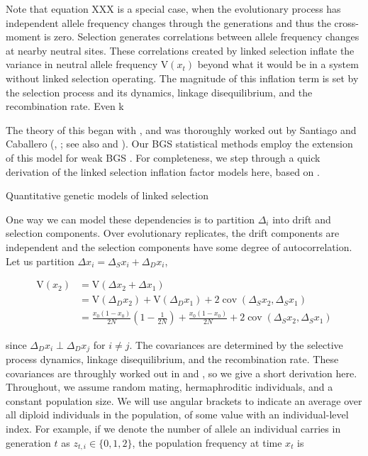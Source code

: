 \documentclass[11pt]{article}
\newcommand{\V}{\text{V}}
\DeclareMathOperator{\cov}{cov}
\begin{document}
Note that equation XXX is a special case, when the evolutionary process has
independent allele frequency changes through the generations and thus the
cross-moment is zero. Selection generates correlations between allele frequency
changes at nearby neutral sites. These correlations created by linked selection
inflate the variance in neutral allele frequency $\V(x_t)$ beyond what it would
be in a system without linked selection operating. The magnitude of this
inflation term is set by the selection process and its dynamics, linkage
disequilibrium, and the recombination rate. Even k




The theory of this began with \textcite{Robertson1961-ho},
and was thoroughly worked out by Santiago and Caballero
(\citeyear{Santiago1995-hx}, \citeyear{Santiago1998-bs}; see also
\cite{Barton2000-zg} and \cite{Buffalo2019-qs}). Our BGS statistical methods
employ the extension of this model for weak BGS \parencite{Santiago2016-mu}.
For completeness, we step through a quick derivation of the linked selection
inflation factor models here, based on
\textcite{Santiago1995-hx,Santiago1998-bs}.

Quantitative genetic models of linked selection




One way we can model these dependencies is to partition $\Delta_i$ into drift
and selection components. Over evolutionary replicates, the drift components
are independent and the selection components have some degree of
autocorrelation. Let us partition $\Delta x_i = \Delta_S x_i + \Delta_D x_i$,

\begin{align}
  \V(x_2) &= \V\left(\Delta x_2 + \Delta x_1\right) \\
          &= \V(\Delta_D x_2) + \V(\Delta_D x_1) + 2 \cov(\Delta_S x_2, \Delta_S x_1) \\
          &= \frac{x_0(1-x_0)}{2N}\left(1 - \frac{1}{2N}\right) + \frac{x_0(1-x_0)}{2N} +  2 \cov(\Delta_S x_2, \Delta_S x_1) 
\end{align}

since $\Delta_D x_i \perp \Delta_D x_j$ for $i \ne j$. The covariances are
determined by the selective process dynamics, linkage disequilibrium, and the
recombination rate. These covariances are throughly worked out in
\textcite{Santiago1995-hx} and \textcite{Buffalo2019-qs}, so we give a short
derivation here. Throughout, we assume random mating, hermaphroditic
individuals, and a constant population size. We will use angular brackets to
indicate an average over all diploid individuals in the population, of some
value with an individual-level index. For example, if we denote the number of
allele an individual carries in generation $t$ as $z_{t,i} \in \{0, 1, 2\}$,
the population frequency at time $x_t$ is
\end{document}
